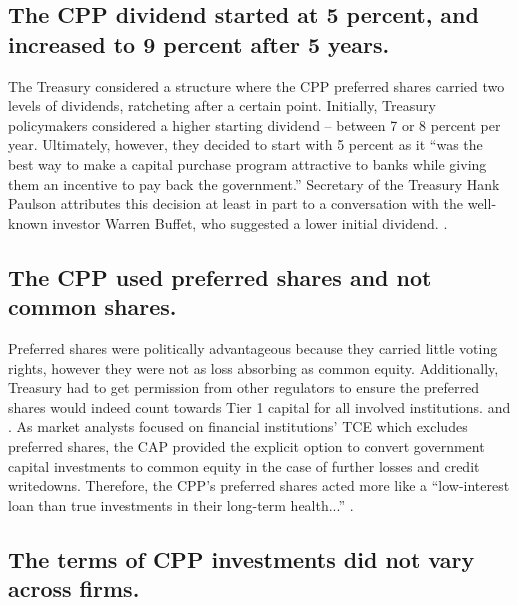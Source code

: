 \documentclass[12pt]{article}
\begin{document}
\subsection{The CPP dividend started at 5 percent, and increased to 9 percent after 5 years.}

The Treasury considered a structure where the CPP preferred shares carried two levels of dividends, ratcheting after a certain point. Initially, Treasury policymakers considered a higher starting dividend -- between 7 or 8 percent per year. Ultimately, however, they decided to start with 5 percent as it ``was the best way to make a capital purchase program attractive to banks while giving them an incentive to pay back the government.'' Secretary of the Treasury Hank Paulson attributes this decision at least in part to a conversation with the well-known investor Warren Buffet, who suggested a lower initial dividend. \citep{paulsonbook}.

\subsection{The CPP used preferred shares and not common shares.}

Preferred shares were politically advantageous because they carried little voting rights, however they were not as loss absorbing as common equity. Additionally, Treasury had to get permission from other regulators to ensure the preferred shares would indeed count towards Tier 1 capital for all involved institutions. \citep{paulsonbook} and \citep{FedTier1}. As market analysts focused on financial institutions' TCE which excludes preferred shares, the CAP provided the explicit option to convert government capital investments to common equity in the case of further losses and credit writedowns. Therefore, the CPP's preferred shares acted more like a ``low-interest loan than true investments in their long-term health...'' \citep{Geithner}. 

\subsection{The terms of CPP investments did not vary across firms.}
\end{document}
